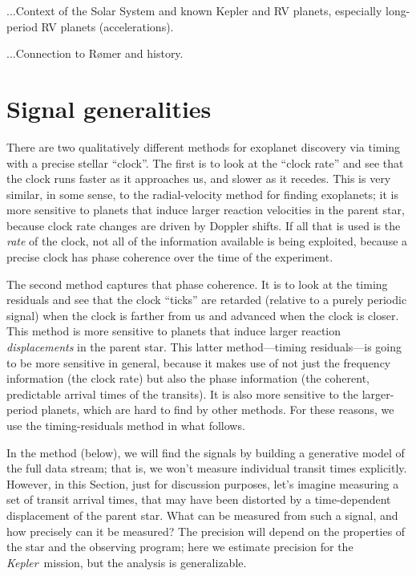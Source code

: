 \documentclass[12pt, preprint]{aastex}
\newcommand{\sectionname}{Section}
\newcommand{\project}[1]{\textsl{#1}}
\newcommand{\Kepler}{\project{Kepler}}
\begin{document}
...Context of the Solar System and known Kepler and RV planets, especially long-period RV planets (accelerations).

...Connection to R\o mer and history.

\section{Signal generalities}

There are two qualitatively different methods for exoplanet discovery
via timing with a precise stellar ``clock''.
The first is to look at the ``clock rate'' and see that the clock runs
faster as it approaches us, and slower as it recedes.
This is very similar, in some sense, to the radial-velocity method for
finding exoplanets; it is more sensitive to planets that induce larger
reaction velocities in the parent star, because clock rate changes are
driven by Doppler shifts.
If all that is used is the \emph{rate} of the clock, not all of the
information available is being exploited, because a precise clock has
phase coherence over the time of the experiment.

The second method captures that phase coherence.
It is to look at the timing residuals and see that the clock ``ticks''
are retarded (relative to a purely periodic signal) when the clock is
farther from us and advanced when the clock is closer.
This method is more sensitive to planets that induce larger reaction
\emph{displacements} in the parent star.
This latter method---timing residuals---is going to be more sensitive
in general, because it makes use of not just the frequency information
(the clock rate) but also the phase information (the coherent,
predictable arrival times of the transits).
It is also more sensitive to the larger-period planets, which are hard
to find by other methods.
For these reasons, we use the timing-residuals method in what follows.

In the method (below), we will find the signals by building a
generative model of the full data stream; that is, we won't measure
individual transit times explicitly.
However, in this \sectionname, just for discussion purposes, let's
imagine measuring a set of transit arrival times, that may have been
distorted by a time-dependent displacement of the parent star.  What
can be measured from such a signal, and how precisely can it be
measured?
The precision will depend on the properties of the star and the
observing program; here we estimate precision for the
\Kepler\ mission, but the analysis is generalizable.
\end{document}
